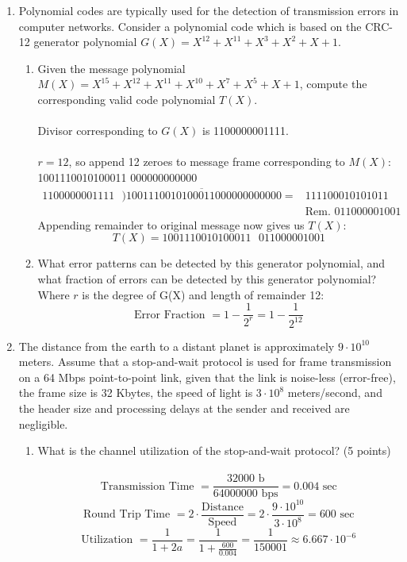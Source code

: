 \documentclass[12pt]{article}
\begin{document}
\begin{enumerate}
\newpage

\item Polynomial codes are typically used for the detection of transmission errors in computer networks. Consider a polynomial code which is based on the CRC-12 generator polynomial $G(X) = X^{12}  +  X^{11}  +  X^3  +  X^2  +  X  +  1$. 
  \begin{enumerate}
  \item Given the message polynomial $M(X) = X^{15} + X^{12} + X^{11} + X^{10} + X^7 + X^5 + X + 1$, compute the corresponding valid code polynomial $T(X)$. \\ \\
    Divisor corresponding to $G(X)$ is 1100000001111. \\ \\
    $r=12$, so append 12 zeroes to message frame corresponding to $M(X)$: 1001110010100011 000000000000
    \begin{align*}
      1100000001111 \text{ }\overline{)1001110010100011000000000000} = & 111100010101011 \\
                                                                       & \text{Rem. }011000001001
    \end{align*}
    Appending remainder to original message now gives us $T(X)$:
    \[ T(X) = 1001110010100011\text{ }011000001001 \]
    
  \item What error patterns can be detected by this generator polynomial, and what fraction of errors can be detected by this generator polynomial? \\ 
    Where $r$ is the degree of G(X) and length of remainder 12:
    \[ \text{Error Fraction } = 1-\frac{1}{2^r} = 1-\frac{1}{2^{12}} \]
  \end{enumerate}

\newpage

\item The distance from the earth to a distant planet is approximately $9 \cdot 10^{10}$ meters.  Assume that a stop-and-wait protocol is used for frame transmission on a 64 Mbps point-to-point link, given that the link is noise-less (error-free), the frame size is 32 Kbytes, the speed of light is $3 \cdot 10^8$ meters/second, and the header size and processing delays at the sender and received are negligible. 
  \begin{enumerate}
  \item What is the channel utilization of the stop-and-wait protocol?  (5 points) \\ \\
    \[ \text{Transmission Time } = \frac{32000 \text{ b}}{64000000 \text{ bps}} = 0.004 \text{ sec} \]
    \[\text{Round Trip Time } = 2 \cdot \frac{\text{Distance}}{\text{Speed}} = 2 \cdot \frac{9\cdot 10^{10}}{3\cdot 10^8} = 600 \text{ sec} \]
    \[\text{Utilization } = \frac{1}{1+2a} = \frac{1}{1+\frac{600}{0.004}} = \frac{1}{150001} \approx 6.667 \cdot 10^{-6} \] 
    

\end{enumerate}
\end{enumerate}
\end{document}
